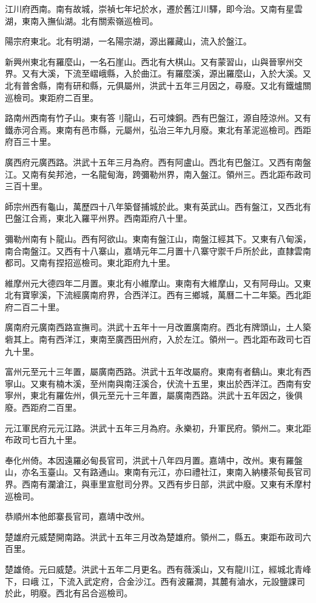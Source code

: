 江川府西南。南有故城，崇禎七年圮於水，遷於舊江川驛，即今治。又南有星雲湖，東南入撫仙湖。北有關索嶺巡檢司。

陽宗府東北。北有明湖，一名陽宗湖，源出羅藏山，流入於盤江。

新興州東北有羅麼山，一名石崖山。西北有大棋山。又有蒙習山，山與晉寧州交界。又有大溪，下流至嶍峨縣，入於曲江。有羅麼溪，源出羅麼山，入於大溪。又北有普舍縣，南有研和縣，元俱屬州，洪武十五年三月因之，尋廢。又北有鐵爐關巡檢司。東距府二百里。

路南州西南有竹子山。東有答刂龍山，石可煉銅。西有巴盤江，源自陸涼州。又有鐵赤河合焉。東南有邑市縣，元屬州，弘治三年九月廢。東北有革泥巡檢司。西距府百三十里。

廣西府元廣西路。洪武十五年三月為府。西有阿盧山。西北有巴盤江。又西有南盤江。又南有矣邦池，一名龍甸海，跨彌勒州界，南入盤江。領州三。西北距布政司三百十里。

師宗州西有龜山，萬歷四十八年築督捕城於此。東有英武山。西有盤江，又西北有巴盤江合焉，東北入羅平州界。西南距府八十里。

彌勒州南有卜龍山。西有阿欲山。東南有盤江山，南盤江經其下。又東有八甸溪，南合南盤江。又西有十八寨山，嘉靖元年二月置十八寨守禦千戶所於此，直隸雲南都司。又南有捏招巡檢司。東北距府九十里。

維摩州元大德四年二月置。東北有小維摩山。東南有大維摩山，又有阿母山。又東北有寶寧溪，下流經廣南府界，合西洋江。西有三鄉城，萬曆二十二年築。西北距府二百二十里。

廣南府元廣南西路宣撫司。洪武十五年十一月改置廣南府。西北有牌頭山，土人築砦其上。南有西洋江，東南至廣西田州府，入於左江。領州一。西北距布政司七百九十里。

富州元至元十三年置，屬廣南西路。洪武十五年改屬府。東南有者鷂山。東北有西寧山。又東有楠木溪，至州南與南汪溪合，伏流十五里，東出於西洋江。西南有安寧州，東北有羅佐州，俱元至元十三年置，屬廣南西路。洪武十五年因之，後俱廢。西距府二百里。

元江軍民府元元江路。洪武十五年三月為府。永樂初，升軍民府。領州二。東北距布政司七百九十里。

奉化州倚。本因遠羅必甸長官司，洪武十八年四月置。嘉靖中，改州。東有羅盤山，亦名玉臺山。又有路通山。東南有元江，亦曰禮社江，東南入納樓茶甸長官司界。西南有瀾滄江，與車里宣慰司分界。又西有步日部，洪武中廢。又東有禾摩村巡檢司。

恭順州本他郎寨長官司，嘉靖中改州。

楚雄府元威楚開南路。洪武十五年三月改為楚雄府。領州二，縣五。東距布政司六百里。

楚雄倚。元曰威楚。洪武十五年二月更名。西有薇溪山，又有龍川江，經城北青峰下，曰峨𡸮江，下流入武定府，合金沙江。西有波羅澗，其麓有滷水，元設鹽課司於此，明廢。西北有呂合巡檢司。

